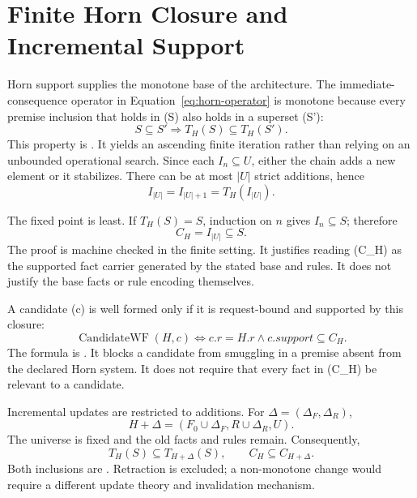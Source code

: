 \section{Finite Horn Closure and Incremental Support}
\label{sec:horn}

Horn support supplies the monotone base of the architecture. The immediate-consequence operator in Equation~\eqref{eq:horn-operator} is monotone because every premise inclusion that holds in (S) also holds in a superset (S'):
\begin{equation}
S\subseteq S'\Longrightarrow T_H(S)\subseteq T_H(S').
\label{eq:horn-monotone}
\end{equation}
This property is \formalized{}. It yields an ascending finite iteration rather than relying on an unbounded operational search. Since each $I_n\subseteq U$, either the chain adds a new element or it stabilizes. There can be at most $|U|$ strict additions, hence
\begin{equation}
I_{|U|}=I_{|U|+1}=T_H(I_{|U|}).
\label{eq:horn-stabilization}
\end{equation}

The fixed point is least. If $T_H(S)=S$, induction on $n$ gives $I_n\subseteq S$; therefore
\begin{equation}
C_H=I_{|U|}\subseteq S.
\label{eq:horn-least}
\end{equation}
The proof is machine checked in the finite setting. It justifies reading (C_H) as the supported fact carrier generated by the stated base and rules. It does not justify the base facts or rule encoding themselves.

A candidate (c) is well formed only if it is request-bound and supported by this closure:
\begin{equation}
\operatorname{CandidateWF}(H,c)\iff
c.r=H.r\land c.support\subseteq C_H.
\label{eq:candidate-wf}
\end{equation}
The formula is \formalized{}. It blocks a candidate from smuggling in a premise absent from the declared Horn system. It does not require that every fact in (C_H) be relevant to a candidate.

Incremental updates are restricted to additions. For $\Delta=(\Delta_F,\Delta_R)$,
\begin{equation}
H+\Delta=(F_0\cup\Delta_F,R\cup\Delta_R,U).
\label{eq:add-only-extension}
\end{equation}
The universe is fixed and the old facts and rules remain. Consequently,
\begin{equation}
T_H(S)\subseteq T_{H+\Delta}(S),
\qquad C_H\subseteq C_{H+\Delta}.
\label{eq:add-only-monotonicity}
\end{equation}
Both inclusions are \formalized{}. Retraction is excluded; a non-monotone change would require a different update theory and invalidation mechanism.

